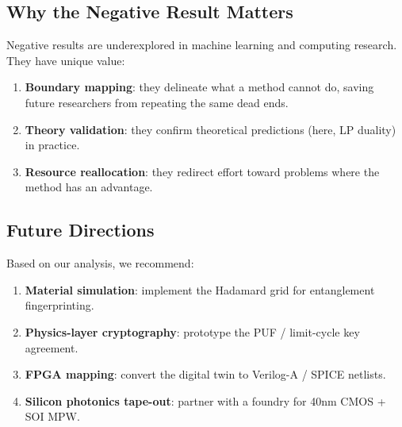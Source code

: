 \subsection{Why the Negative Result Matters}

Negative results are underexplored in machine learning and 
computing research. They have unique value:
\begin{enumerate}[leftmargin=*]
    \item \textbf{Boundary mapping}: they delineate what a method 
          cannot do, saving future researchers from repeating 
          the same dead ends.
    \item \textbf{Theory validation}: they confirm theoretical 
          predictions (here, LP duality) in practice.
    \item \textbf{Resource reallocation}: they redirect effort 
          toward problems where the method has an advantage.
\end{enumerate}

\subsection{Future Directions}

Based on our analysis, we recommend:
\begin{enumerate}[leftmargin=*]
    \item \textbf{Material simulation}: implement the Hadamard 
          grid for entanglement fingerprinting.
    \item \textbf{Physics-layer cryptography}: prototype the 
          PUF / limit-cycle key agreement.
    \item \textbf{FPGA mapping}: convert the digital twin to 
          Verilog-A / SPICE netlists.
    \item \textbf{Silicon photonics tape-out}: partner with 
          a foundry for 40nm CMOS + SOI MPW.
\end{enumerate}